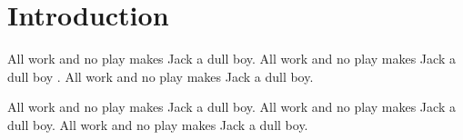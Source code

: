 
%
%

%
%

\section{Introduction}
\label{sec:introduction}

All work and no play makes Jack a dull boy.
All work and no play makes Jack a dull boy
\cite{knuth-website}
\cite{knuth-fundamental-algorithms}
\cite{dirac-quantum-mechanics}.
All work and no play makes Jack a dull boy.

All work and no play makes Jack a dull boy.
All work and no play makes Jack a dull boy.
All work and no play makes Jack a dull boy.

